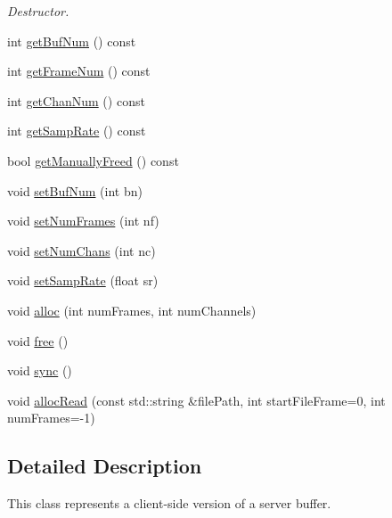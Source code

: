 \begin{DoxyCompactItemize}
\begin{DoxyCompactList}\small\item\em Destructor. \end{DoxyCompactList}\item 
int \hyperlink{classColliderPlusPlus_1_1Buffer_a0c00584a7afb6fc0e0a8791cd4a8f0b5}{get\-Buf\-Num} () const 
\item 
int \hyperlink{classColliderPlusPlus_1_1Buffer_a59f84ebba0ce0c7707dbf37ef8a9ac0f}{get\-Frame\-Num} () const 
\item 
int \hyperlink{classColliderPlusPlus_1_1Buffer_a8f782a6d9a03b47ddaa3067e4c09bc63}{get\-Chan\-Num} () const 
\item 
int \hyperlink{classColliderPlusPlus_1_1Buffer_aa0c5ce2e5ede311b515b7748fc7074d5}{get\-Samp\-Rate} () const 
\item 
bool \hyperlink{classColliderPlusPlus_1_1Buffer_a021329a8faaecd4ebb58b291b1ded6c4}{get\-Manually\-Freed} () const 
\item 
void \hyperlink{classColliderPlusPlus_1_1Buffer_a860869166e3ded181813158b8ba9159b}{set\-Buf\-Num} (int bn)
\item 
void \hyperlink{classColliderPlusPlus_1_1Buffer_a4326fdc6e8e7e988adf7188c8cfc5fc1}{set\-Num\-Frames} (int nf)
\item 
void \hyperlink{classColliderPlusPlus_1_1Buffer_acfee7fb4d7e5ff2dadf2aae85abd6ff6}{set\-Num\-Chans} (int nc)
\item 
void \hyperlink{classColliderPlusPlus_1_1Buffer_a028e5dc76e6b54faf9ef0a3c9eeb2ae1}{set\-Samp\-Rate} (float sr)
\item 
void \hyperlink{classColliderPlusPlus_1_1Buffer_a2d9c1a08d1e3080ed0b4a3780b18be15}{alloc} (int num\-Frames, int num\-Channels)
\item 
void \hyperlink{classColliderPlusPlus_1_1Buffer_ad4eb930f170b4ae398239750cb981f73}{free} ()
\item 
void \hyperlink{classColliderPlusPlus_1_1Buffer_af6efd69eef95bf0202498acc256e7f3f}{sync} ()
\item 
void \hyperlink{classColliderPlusPlus_1_1Buffer_a57e3976a06f74c7605cb9523da6367c7}{alloc\-Read} (const std\-::string \&file\-Path, int start\-File\-Frame=0, int num\-Frames=-\/1)
\end{DoxyCompactItemize}


\subsection{Detailed Description}
This class represents a client-\/side version of a server buffer. 

